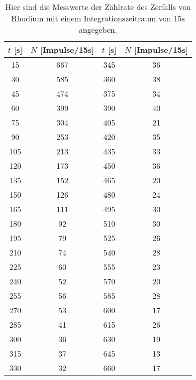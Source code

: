     \begin{table}[h]
        \centering
        \caption{Hier sind die Messwerte der Zählrate des Zerfalls von Rhodium mit einem Integrationszeitraum von 15s angegeben.}
        \label{tab:Rhodium}
        \begin{tabular}{c c c c}
        \toprule
        {$t$ [s]} & {$N$ [Impulse/15s]} & {$t$ [s]} & {$N$ [Impulse/15s]} \\
        \midrule
            15    &   667   &   345   &   36 \\ 
            30    &   585   &   360   &   38 \\ 
            45    &   474   &   375   &   34 \\
            60    &   399   &   390   &   40 \\
            75    &   304   &   405   &   21 \\
            90    &   253   &   420   &   35 \\
            105   &   213   &   435   &   33 \\
            120   &   173   &   450   &   36 \\
            135   &   152   &   465   &   20 \\
            150   &   126   &   480   &   24 \\
            165   &   111   &   495   &   30 \\
            180   &    92   &   510   &   30 \\
            195   &    79   &   525   &   26 \\
            210   &    74   &   540   &   28 \\
            225   &    60   &   555   &   23 \\
            240   &    52   &   570   &   20 \\
            255   &    56   &   585   &   28 \\
            270   &    53   &   600   &   17 \\
            285   &    41   &   615   &   26 \\
            300   &    36   &   630   &   19 \\
            315   &    37   &   645   &   13 \\
            330   &    32   &   660   &   17 \\
            \bottomrule
        \end{tabular}
    \end{table}

    \FloatBarrier
